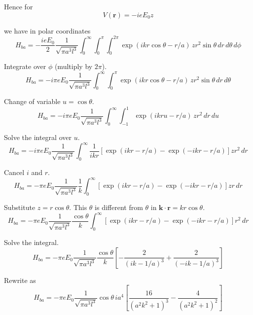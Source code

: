 Hence for
\begin{equation*}
V(\mathbf r)=-ieE_0z
\end{equation*}

we have in polar coordinates
\begin{equation*}
H_{ba}=-\frac{ieE_0}{2}
\frac{1}{\sqrt{\pi a^3l^3}}
\int_0^\infty\int_0^\pi\int_0^{2\pi}
\exp(ikr\cos\theta-r/a)\,zr^2\sin\theta\,dr\,d\theta\,d\phi
\end{equation*}

Integrate over $\phi$ (multiply by $2\pi$).
\begin{equation*}
H_{ba}=-i\pi eE_0
\frac{1}{\sqrt{\pi a^3l^3}}
\int_0^\infty\int_0^\pi
\exp(ikr\cos\theta-r/a)\,zr^2\sin\theta\,dr\,d\theta
\end{equation*}

Change of variable $u=\cos\theta$.
\begin{equation*}
H_{ba}=-i\pi eE_0
\frac{1}{\sqrt{\pi a^3l^3}}
\int_0^\infty\int_{-1}^1
\exp(ikru-r/a)\,zr^2\,dr\,du
\end{equation*}

Solve the integral over $u$.
\begin{equation*}
H_{ba}=-i\pi eE_0
\frac{1}{\sqrt{\pi a^3l^3}}
\int_0^\infty
\frac{1}{ikr}
\left[\exp(ikr-r/a)-\exp(-ikr-r/a)\right]
zr^2\,dr
\tag{3}
\end{equation*}

Cancel $i$ and $r$.
\begin{equation*}
H_{ba}=-\pi eE_0
\frac{1}{\sqrt{\pi a^3l^3}}\frac{1}{k}
\int_0^\infty
\left[\exp(ikr-r/a)-\exp(-ikr-r/a)\right]
zr\,dr
\end{equation*}

Substitute $z=r\cos\theta$.
This $\theta$ is different from $\theta$ in $\mathbf k\cdot\mathbf r=kr\cos\theta$.
\begin{equation*}
H_{ba}=-\pi eE_0
\frac{1}{\sqrt{\pi a^3l^3}}\frac{\cos\theta}{k}
\int_0^\infty
\left[\exp(ikr-r/a)-\exp(-ikr-r/a)\right]
r^2\,dr
\end{equation*}

Solve the integral.
\begin{equation*}
H_{ba}=-\pi eE_0
\frac{1}{\sqrt{\pi a^3l^3}}\frac{\cos\theta}{k}
\left[-\frac{2}{(ik-1/a)^3}+\frac{2}{(-ik-1/a)^3}\right]
\tag{4}
\end{equation*}

Rewrite as
\begin{equation*}
H_{ba}=-\pi eE_0
\frac{1}{\sqrt{\pi a^3l^3}}\cos\theta\,
ia^4\left[\frac{16}{(a^2k^2+1)^3}-\frac{4}{(a^2k^2+1)^2}\right]
\tag{5}
\end{equation*}

